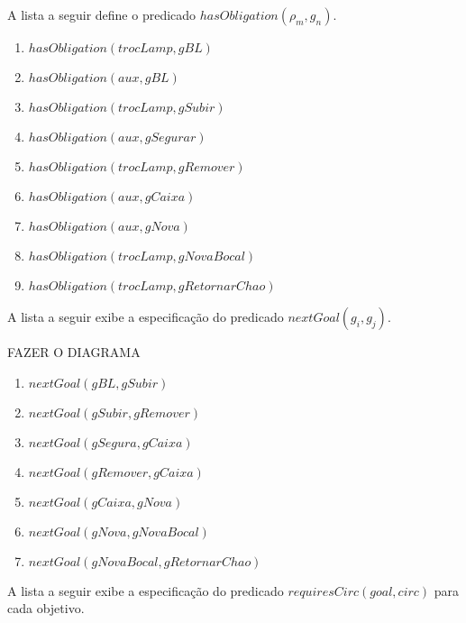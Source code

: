 A lista a seguir define o predicado $hasObligation(\rho_m,g_n)$. 

\begin{enumerate}
	\item $hasObligation(trocLamp,gBL)$
	\item $hasObligation(aux,gBL)$
	\item $hasObligation(trocLamp,gSubir)$
	\item $hasObligation(aux,gSegurar)$
	\item $hasObligation(trocLamp,gRemover)$
	\item $hasObligation(aux,gCaixa)$
	\item $hasObligation(aux,gNova)$
	\item $hasObligation(trocLamp,gNovaBocal)$
	\item $hasObligation(trocLamp,gRetornarChao)$
\end{enumerate}

A lista a seguir exibe a especificação do predicado $nextGoal(g_i,g_j)$. 

FAZER O DIAGRAMA
 
\begin{enumerate}
	\item $nextGoal(gBL,gSubir)$
	\item $nextGoal(gSubir,gRemover)$
	\item $nextGoal(gSegura,gCaixa)$ 
	\item $nextGoal(gRemover,gCaixa)$
	\item $nextGoal(gCaixa,gNova)$
	\item $nextGoal(gNova,gNovaBocal)$
	\item $nextGoal(gNovaBocal,gRetornarChao)$
\end{enumerate}

A lista a seguir exibe a especificação do predicado $requiresCirc(goal,circ)$ para cada objetivo.

